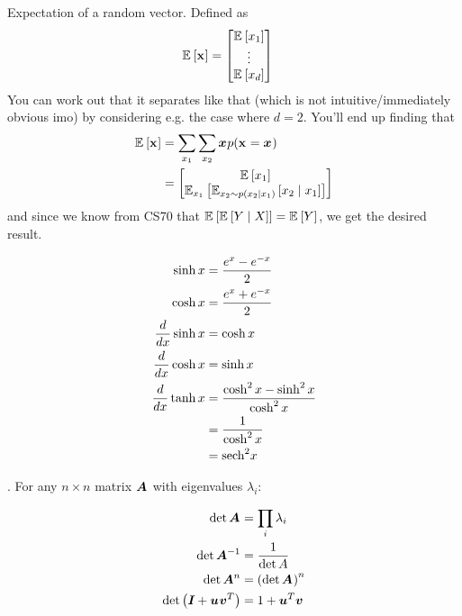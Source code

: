 \documentclass[11pt]{article}
\begin{document}
\begin{compactitem}
	\item Expectation of a random vector. Defined as
	\begin{align}
		\E{\rvec{x}} &= \begin{bmatrix}
			\E{x_1} \\ \vdots \\ \E{x_d}
		\end{bmatrix}
	\end{align}
	You can work out that it separates like that (which is not intuitive/immediately obvious imo) by considering e.g. the case where $d=2$. You'll end up finding that
	\begin{align}
		\E{\rvec x}
			&= \sum_{x_1} \sum_{x_2} \vec x p(\rvec{x} = \vec{x}) \\
			&= \begin{bmatrix}
				\E{x_1} \\ \E[x_1]{\E[x_2 \sim p(x_2 \mid x_1)]{x_2 \mid x_1}  }
			\end{bmatrix}
	\end{align}
	and since we know from CS70 that $\E{\E{Y \mid X}} = \E{Y}$, we get the desired result.
\end{compactitem}




\begin{align}
	\sinh x 
		&= \frac{e^x - e^{-x}}{2} \\
	\cosh x
		&= \frac{e^x + e^{-x}}{2} \\
	\deriv{}{x} \sinh x 
		&= \cosh x \\
	\deriv{}{x} \cosh x
		&= \sinh x \\
	\deriv{}{x} \tanh x
		&= \frac{ \cosh^2 x - \sinh^2 x }{\cosh^2 x} \\
		&= \inv{\cosh^2 x} \\
		&= \text{sech}^2 x
\end{align}






. For any $n \times n$ matrix $\matr A$ with eigenvalues $\lambda_i$:

\begin{align}
	\det \matr A 
		&= \prod_i \lambda_i \\
	\det \minv{A}
		&= \inv{\det A} \\
	\det \matr{A}^n 
		&= \lr{ \det \matr A }^n \\
	\det\lr{\matr I + \vec u \vec{v}^T}
		&= 1 + \vec{u}^T \vec{v}
\end{align}
\end{document}
